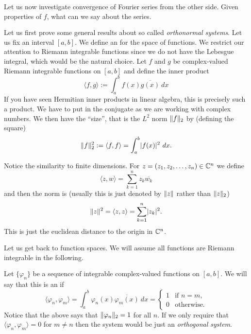 \medskip

Let us now investigate convergence of Fourier series from the other side.
Given properties of $f$, what can we say about the series.

Let us first prove some general results about so called
\emph{orthonormal systems}.
Let us fix an interval $[a,b]$.  We define an
\emph{} for the space of functions.  We restrict our attention
to Riemann integrable functions since we do not have the Lebesgue
integral, which
would be the natural choice.  Let $f$ and $g$ be complex-valued 
Riemann integrable functions on $[a,b]$ and define the inner product
\begin{equation*}
\langle f , g \rangle :=
\int_a^b f(x) \overline{g(x)} ~ dx
\end{equation*}
If you have seen Hermitian inner products in linear algebra, this
is precisely such a product.  We have to put in the conjugate as we are
working with complex numbers.  We then have the ``size'', that is the
$L^2$ norm $\lVert {f} \rVert_2$ by (defining the square)
\begin{equation*}
\lVert {f} \rVert_2^2 :=
\langle f , f \rangle =
\int_a^b \lvert {f(x)} \rvert^2 ~ dx .
\end{equation*}

\begin{remark}
Notice the similarity to finite dimensions.  For $z = (z_1,z_2,\ldots,z_n) \in 
{\mathbb{C}}^n$ we define 
\begin{equation*}
\langle z , w \rangle =
\sum_{k=1}^n z_k \overline{w_k}
\end{equation*}
and then the norm is (usually this is just denoted by $\lVert {z} \rVert$ rather than
$\lVert {z} \rVert_2$)
\begin{equation*}
\lVert {z} \rVert^2 = 
\langle z , z \rangle =
\sum_{k=1}^n \lvert {z_k} \rvert^2 .
\end{equation*}
This is just the euclidean distance to the origin in ${\mathbb{C}}^n$.
\end{remark}

Let us get back to function spaces.  We will assume all functions are
Riemann integrable in the following.

\begin{defn}
Let $\{ \varphi_n \}$ be a sequence of integrable complex-valued
functions on $[a,b]$.  We will say that this is an
\emph{} if
\begin{equation*}
\langle \varphi_n , \varphi_m \rangle
=
\int_a^b \varphi_n(x) \overline{\varphi_m(x)} ~ dx
= 
\begin{cases}
1 & \text{if $n=m$,} \\
0 & \text{otherwise.}
\end{cases}
\end{equation*}
Notice that the above says that $\lVert {\varphi_n} \rVert_2 = 1$ for all $n$.  If we
only require that 
$\langle \varphi_n , \varphi_m \rangle = 0$ for $m\not= n$ then
the system would be just an \emph{orthogonal system}.
\end{defn}

